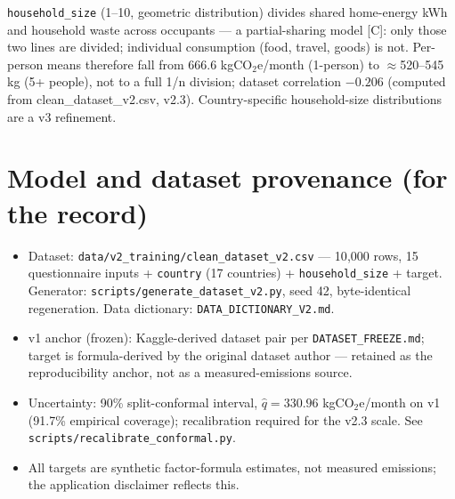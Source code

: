 \documentclass[11pt,a4paper]{article}
\begin{document}
\texttt{household\_size} (1--10, geometric distribution) divides shared
home-energy kWh and household waste across occupants --- a partial-sharing
model [C]: only those two lines are divided; individual consumption (food,
travel, goods) is not. Per-person means therefore fall from 666.6
kgCO$_2$e/month (1-person) to $\approx$520--545 kg (5+ people), not to a full
1/n division; dataset correlation $-0.206$ (computed from
clean\_dataset\_v2.csv, v2.3). Country-specific household-size
distributions are a v3 refinement.

\section{Model and dataset provenance (for the record)}

\begin{itemize}
  \item Dataset: \texttt{data/v2\_training/clean\_dataset\_v2.csv} ---
        10{,}000 rows, 15 questionnaire inputs + \texttt{country}
        (17 countries) + \texttt{household\_size} + target. Generator:
        \texttt{scripts/generate\_dataset\_v2.py}, seed 42, byte-identical
        regeneration. Data dictionary:
        \texttt{DATA\_DICTIONARY\_V2.md}.
  \item v1 anchor (frozen): Kaggle-derived dataset pair per
        \texttt{DATASET\_FREEZE.md}; target is formula-derived by the
        original dataset author --- retained as the reproducibility
        anchor, not as a measured-emissions source.
  \item Uncertainty: 90\% split-conformal interval, $\hat{q} = 330.96$
        kgCO$_2$e/month on v1 (91.7\% empirical coverage); recalibration
        required for the v2.3 scale. See
        \texttt{scripts/recalibrate\_conformal.py}.
  \item All targets are synthetic factor-formula estimates, not measured
        emissions; the application disclaimer reflects this.
\end{itemize}



\end{document}

